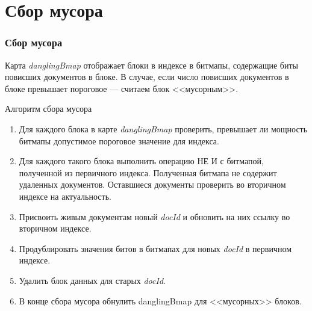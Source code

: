 \documentclass[aspectratio=169, pdf, 8pt, unicode]{beamer}
\begin{document}
\section{Сбор мусора}

\begin{frame}[fragile]
\frametitle{Сбор мусора}

Карта \textit{danglingBmap} отображает блоки в индексе в битмапы,
содержащие биты повисших документов в блоке. В случае, если число повисших документов в блоке превышает пороговое — считаем блок <<мусорным>>.

\begin{block}{Алгоритм сбора мусора}
    \begin{enumerate}
        \item Для каждого блока в карте \textit{danglingBmap} проверить, превышает ли мощность битмапы допустимое пороговое значение для индекса.
        \item Для каждого такого блока выполнить операцию НЕ И с битмапой, полученной из первичного индекса. Полученная битмапа не содержит удаленных документов. Оставшиеся документы проверить во вторичном индексе на актуальность.
        \item Присвоить живым документам новый \textit{docId} и обновить на них ссылку во вторичном индексе.
        \item Продублировать значения битов в битмапах для новых \textit{docId} в первичном индексе.
        \item Удалить блок данных для старых \textit{docId}.
        \item В конце сбора мусора обнулить danglingBmap для <<мусорных>> блоков.
    \end{enumerate}
\end{block}
\end{frame}
\end{document}
